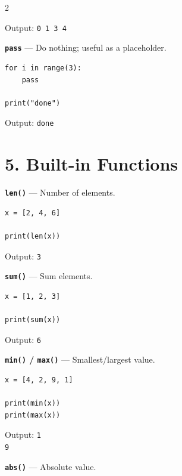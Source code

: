 \documentclass[10pt,a4paper]{article}
\begin{document}
\begin{multicols}{2}
\begin{card}
Output:
\texttt{0 1 3 4}
\end{card}

\begin{card}
\textbf{\texttt{pass}} --- Do nothing; useful as a placeholder.

\begin{lstlisting}[style=pythonstyle]
for i in range(3):
    pass

print("done")
\end{lstlisting}

Output:
\texttt{done}
\end{card}

\section*{5. Built-in Functions}

\begin{card}
\textbf{\texttt{len()}} --- Number of elements.

\begin{lstlisting}[style=pythonstyle]
x = [2, 4, 6]

print(len(x))
\end{lstlisting}

Output: \texttt{3}
\end{card}

\begin{card}
\textbf{\texttt{sum()}} --- Sum elements.

\begin{lstlisting}[style=pythonstyle]
x = [1, 2, 3]

print(sum(x))
\end{lstlisting}

Output: \texttt{6}
\end{card}

\begin{card}
\textbf{\texttt{min()} / \texttt{max()}} --- Smallest/largest value.

\begin{lstlisting}[style=pythonstyle]
x = [4, 2, 9, 1]

print(min(x))
print(max(x))
\end{lstlisting}

Output:
\texttt{1}\\
\texttt{9}
\end{card}

\begin{card}
\textbf{\texttt{abs()}} --- Absolute value.


\end{card}
\end{multicols}
\end{document}
